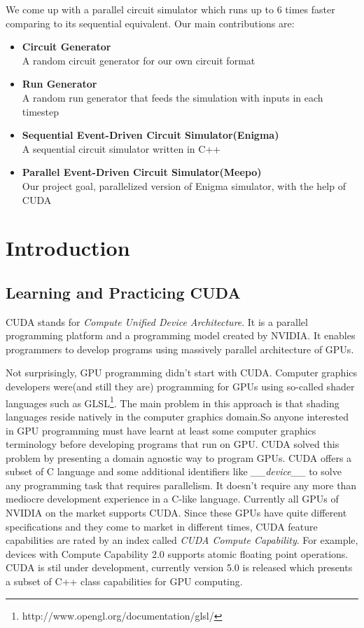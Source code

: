 \documentclass[a4paper,onesided,12pt]{report}
\begin{document}
 We come up with a parallel circuit simulator which runs up to 6 times faster comparing to its sequential equivalent. Our main contributions are:
 \begin{itemize}
 \item \textbf{Circuit Generator} \\ A random circuit generator for our own circuit format
 \item \textbf{Run Generator} \\ A random run generator that feeds the simulation with inputs in each timestep
 \item \textbf{Sequential Event-Driven Circuit Simulator(Enigma)} \\ A sequential circuit simulator written in C++
 \item \textbf{Parallel Event-Driven Circuit Simulator(Meepo)} \\ Our project goal, parallelized version of Enigma simulator, 
 with the help of CUDA
 \end{itemize}
 
 \chapter{Introduction}
 \section{Learning and Practicing CUDA}
 
 CUDA stands for \emph{Compute Unified Device Architecture}. It is a parallel programming platform and a programming model created by NVIDIA. It enables programmers to develop programs using massively parallel architecture of GPUs.
 
 Not surprisingly, GPU programming didn't start with CUDA. Computer graphics developers were(and still they are) programming for GPUs using so-called shader languages such as GLSL\footnote{http://www.opengl.org/documentation/glsl/}. The main problem in this approach is that shading languages reside natively in the computer graphics domain.So anyone interested in GPU programming must have learnt at least some computer graphics terminology before developing programs that run on GPU. CUDA solved this problem by presenting a domain agnostic way to program GPUs. CUDA offers a subset of C language and some additional identifiers like \emph{\_\_device\_\_} to solve any programming task that requires parallelism. It doesn't require any more than mediocre development experience in a C-like language. Currently all GPUs of NVIDIA on the market supports CUDA. Since these GPUs have quite different specifications and they come to market in different times, CUDA feature capabilities are rated by an index called \emph{CUDA Compute Capability}. For example, devices with Compute Capability 2.0 supports atomic floating point operations. CUDA is stil under development, currently version 5.0 is released which presents a subset of C++ class capabilities for GPU computing. 
 
\end{document}

